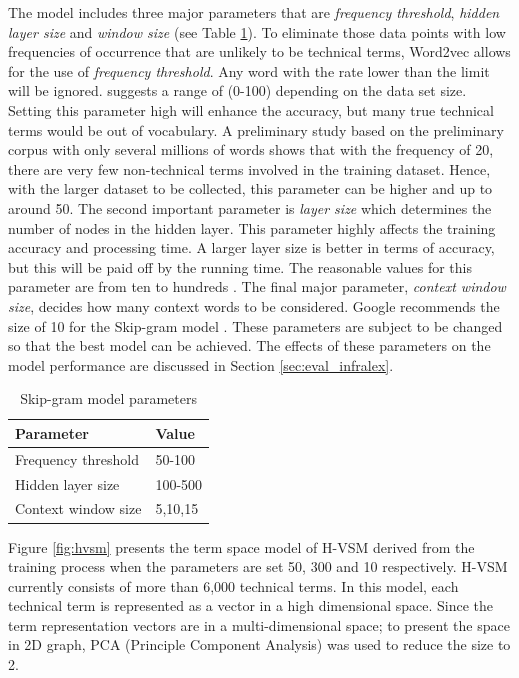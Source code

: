 \documentclass[Journal,InsideFigs, DoubleSpace]{ascelike} %
\begin{document}
{The model includes three major parameters that are \textit{frequency threshold}, \textit{hidden layer size} and \textit{window size} (see Table \ref{table:nn-parameters}). To eliminate those data points with low frequencies of occurrence that are unlikely to be technical terms, Word2vec allows for the use of \textit{frequency threshold}. Any word with the rate lower than the limit will be ignored.  suggests a range of (0-100) depending on the data set size. Setting this parameter high will enhance the accuracy, but many true technical terms would be out of vocabulary. A preliminary study based on the preliminary corpus with only several millions of words shows that with the frequency of 20, there are very few non-technical terms involved in the training dataset. Hence, with the larger dataset to be collected, this parameter can be higher and up to around 50. The second important parameter is \textit{layer size} which determines the number of nodes in the hidden layer. This parameter highly affects the training accuracy and processing time. A larger layer size is better in terms of accuracy, but this will be paid off by the running time. The reasonable values for this parameter are from ten to hundreds \cite{rehurek14}. The final major parameter, \textit{context window size}, decides how many context words to be considered. Google recommends the size of 10 for the Skip-gram model \cite{google2016}. These parameters are subject to be changed so that the best model can be achieved. The effects of these parameters on the model performance are discussed in Section \ref{sec:eval_infralex}.
%
\begin{table} [t]
	\caption{Skip-gram model parameters}
	\label{table:nn-parameters}
	\centering
	\small
	\renewcommand{\arraystretch}{1.25}
	\begin{tabular}{l l}
		\hline
		\textbf{Parameter} & \textbf{Value}\\
		\hline
		Frequency threshold & 50-100\\
		Hidden layer size		&	100-500\\
		Context window size	&	5,10,15\\
		\hline
	\end{tabular}
	\normalsize
\end{table}
%
\par
Figure \ref{fig:hvsm} presents the term space model of H-VSM derived from the training process when the parameters are set 50, 300 and 10 respectively. H-VSM currently consists of more than 6,000 technical terms. In this model, each technical term is represented as a vector in a high dimensional space. Since the term representation vectors are in a multi-dimensional space; to present the space in 2D graph, PCA (Principle Component Analysis) was used to reduce the size to 2.
}
\end{document}
